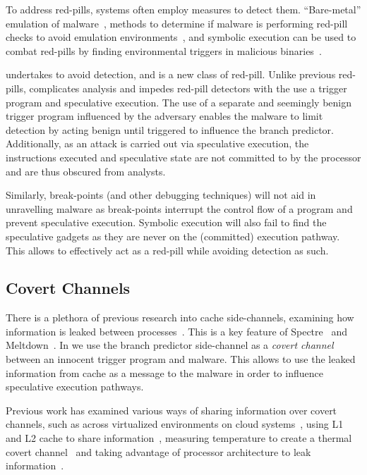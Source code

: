 To address red-pills, systems often employ measures to detect them.
``Bare-metal'' emulation of malware~\cite{kirat2011barebox}, methods to
determine if malware is performing red-pill checks to avoid emulation
environments~\cite{kirat2014barecloud}, and symbolic execution can be used to
combat red-pills by finding environmental triggers in malicious
binaries~\cite{schwartz2010all}. 

\speculake undertakes to avoid detection, and is a new class of red-pill. Unlike
previous red-pills, \speculake complicates analysis and impedes red-pill
detectors with the use a trigger program and speculative execution. The use of a
separate and seemingly benign trigger program influenced by the adversary
enables the \speculake malware to limit detection by acting benign until
triggered to influence the branch predictor. Additionally, as an \speculake
attack is carried out via speculative execution, the instructions executed and
speculative state are not committed to by the processor and are thus obscured
from analysts.

Similarly, break-points (and other debugging techniques) will not aid in
unravelling \speculake malware as break-points interrupt the control flow of a
program and prevent speculative execution. Symbolic execution will also fail to
find the speculative gadgets as they are never on the (committed) execution
pathway. This allows \speculake to effectively act as a red-pill while avoiding
detection as such.

\subsection{Covert Channels}

There is a plethora of previous research into cache side-channels, examining how
information is leaked between
processes~\cite{percival2005cache,zhang2012cross,osvik2006cache}. This is a key
feature of Spectre~\cite{spectre} and Meltdown~\cite{meltdown}. In \speculake we
use the branch predictor side-channel as a \emph{covert
channel}~\cite{lampson1973note} between an innocent trigger program and malware.
This allows \speculake to use the leaked information from cache as a message to
the malware in order to influence speculative execution pathways.

Previous work has examined various ways of sharing information over covert
channels, such as across virtualized environments on cloud
systems~\cite{wu2012whispers}, using L1 and L2 cache to share
information~\cite{percival2005cache}, measuring temperature to create a thermal
covert channel~\cite{masti2015thermal, bartolini2016capacity} and taking
advantage of processor architecture to leak information~\cite{wang2006covert}.


